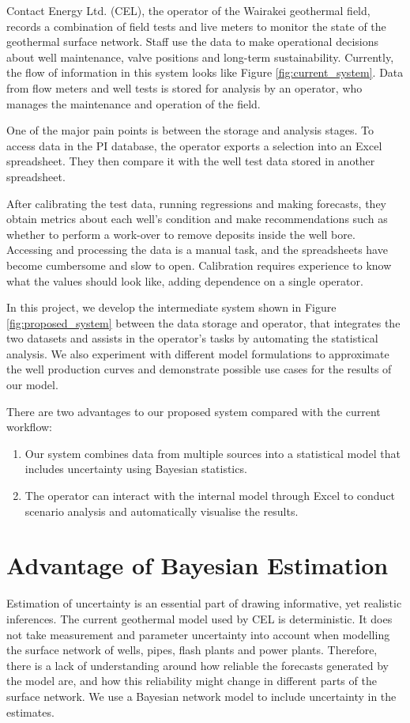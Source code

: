 \documentclass[a4paper, 12pt]{article}
\begin{document}
Contact Energy Ltd. (CEL), the operator of the Wairakei geothermal field, records a combination of field tests and live meters to monitor the state of the geothermal surface network. Staff use the data to make operational decisions about well maintenance, valve positions and long-term sustainability. Currently, the flow of information in this system looks like Figure \ref{fig:current_system}. Data from flow meters and well tests is stored for analysis by an operator, who manages the maintenance and operation of the field. 

One of the major pain points is between the storage and analysis stages. To access data in the PI database, the operator exports a selection into an Excel spreadsheet. They then compare it with the well test data stored in another spreadsheet.

After calibrating the test data, running regressions and making forecasts, they obtain metrics about each well's condition and make recommendations such as whether to perform a work-over to remove deposits inside the well bore. Accessing and processing the data is a manual task, and the spreadsheets have become cumbersome and slow to open. Calibration requires experience to know what the values should look like, adding dependence on a single operator.

In this project, we develop the intermediate system shown in Figure \ref{fig:proposed_system} between the data storage and operator, that integrates the two datasets and assists in the operator's tasks by automating the statistical analysis. We also experiment with different model formulations to approximate the well production curves and demonstrate possible use cases for the results of our model.

There are two advantages to our proposed system compared with the current workflow:
\begin{enumerate}
\item Our system combines data from multiple sources into a statistical model that includes uncertainty using Bayesian statistics.
\item The operator can interact with the internal model through Excel to conduct scenario analysis and automatically visualise the results.
\end{enumerate}

\section{Advantage of Bayesian Estimation}
Estimation of uncertainty is an essential part of drawing informative, yet realistic inferences. The current geothermal model used by CEL is deterministic. It does not take measurement and parameter uncertainty into account when modelling the surface network of wells, pipes, flash plants and power plants. Therefore, there is a lack of understanding around how reliable the forecasts generated by the model are, and how this reliability might change in different parts of the surface network. We use a Bayesian network model to include uncertainty in the estimates.
\end{document}
